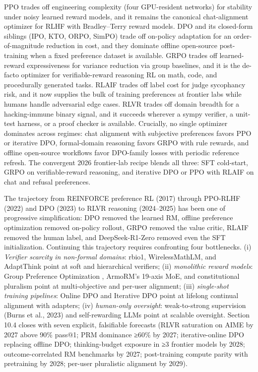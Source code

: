 \documentclass{article}
\begin{document}
PPO trades off engineering complexity (four GPU-resident networks) for stability under noisy learned reward models, and it remains the canonical chat-alignment optimizer for RLHF with Bradley--Terry reward models. DPO and its closed-form siblings (IPO, KTO, ORPO, SimPO) trade off on-policy adaptation for an order-of-magnitude reduction in cost, and they dominate offline open-source post-training when a fixed preference dataset is available. GRPO trades off learned-reward expressiveness for variance reduction via group baselines, and it is the de-facto optimizer for verifiable-reward reasoning RL on math, code, and procedurally generated tasks. RLAIF trades off label cost for judge sycophancy risk, and it now supplies the bulk of training preferences at frontier labs while humans handle adversarial edge cases. RLVR trades off domain breadth for a hacking-immune binary signal, and it succeeds wherever a sympy verifier, a unit-test harness, or a proof checker is available. Crucially, no single optimizer dominates across regimes: chat alignment with subjective preferences favors PPO or iterative DPO, formal-domain reasoning favors GRPO with rule rewards, and offline open-source workflows favor DPO-family losses with periodic reference refresh. The convergent 2026 frontier-lab recipe blends all three: SFT cold-start, GRPO on verifiable-reward reasoning, and iterative DPO or PPO with RLAIF on chat and refusal preferences.

The trajectory from REINFORCE preference RL (2017) through PPO-RLHF (2022) and DPO (2023) to RLVR reasoning (2024--2025) has been one of progressive simplification: DPO removed the learned RM, offline preference optimization removed on-policy rollout, GRPO removed the value critic, RLAIF removed the human label, and DeepSeek-R1-Zero removed even the SFT initialization. Continuing this trajectory requires confronting four bottlenecks. (i) \emph{Verifier scarcity in non-formal domains}: rbio1, WirelessMathLM, and AdaptThink point at soft and hierarchical verifiers; (ii) \emph{monolithic reward models}: Group Preference Optimization \citep{zhao2023grouppreferenceopt}, ArmoRM's 19-axis MoE, and constitutional pluralism \citep{barman2024reinforcementlearn} point at multi-objective and per-user alignment; (iii) \emph{single-shot training pipelines}: Online DPO and Iterative DPO point at lifelong continual alignment with adapters; (iv) \emph{human-only oversight}: weak-to-strong supervision (Burns et al., 2023) and self-rewarding LLMs \citep{yuan2023rrhfrankresponsest} point at scalable oversight. Section 10.4 closes with seven explicit, falsifiable forecasts (RLVR saturation on AIME by 2027 above 90\% pass@1; PRM dominance ≥60\% by 2027; iterative-online DPO replacing offline DPO; thinking-budget exposure in ≥3 frontier models by 2028; outcome-correlated RM benchmarks by 2027; post-training compute parity with pretraining by 2028; per-user pluralistic alignment by 2029).
\end{document}
